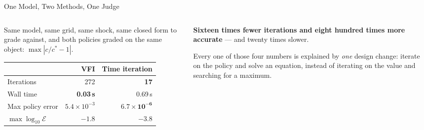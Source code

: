 \begin{frame}{One Model, Two Methods, One Judge}
\begin{columns}[T]
\begin{column}{0.53\textwidth}
\small
Same model, same grid, same shock, same closed form to grade against, and both policies graded on the same object: $\max|c/c^{*}-1|$.
\medskip
\begin{center}\footnotesize
\begin{tabular}{@{}lrr@{}}
\toprule
 & \textbf{VFI} & \textbf{Time iteration} \\
\midrule
Iterations & 272 & \textbf{17} \\
Wall time & \textbf{0.03\,s} & 0.69\,s \\
Max policy error & $5.4\times10^{-3}$ & $\mathbf{6.7\times10^{-6}}$ \\
$\max\log_{10}\mathcal{E}$ & $-1.8$ & $\mathbf{-3.8}$ \\
\bottomrule
\end{tabular}
\end{center}
\end{column}
\begin{column}{0.44\textwidth}
\begin{conceptbox}\small
\textbf{Sixteen times fewer iterations and eight hundred times more accurate} --- and twenty times slower.
\end{conceptbox}
\medskip
\begin{examplebox}\footnotesize
Every one of those four numbers is explained by \emph{one} design change: iterate on the policy and solve an equation, instead of iterating on the value and searching for a maximum.
\end{examplebox}
\end{column}
\end{columns}
\end{frame}


